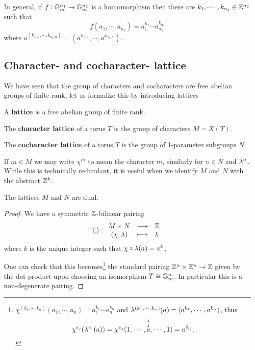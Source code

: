 \begin{remark}
In general, if $f:\mathbb{G}_m^{n_1}\to \mathbb{G}_m^{n_2}$ is a homomorphism then there are $k_1,\cdots, k_{n_1}\in \mathbb{Z}^{n_2}$ such that
\[f(a_1,\cdots, a_{n_1})=a_1^{k_1}\cdots a_{n_1}^{k_{n_1}}\]
where $a^{(k_{1,h},\cdots, k_{n_2,h})}=(a^{k_{1,h}},\cdots, a^{k_{n_2,h}})$.
\end{remark}

\subsection{Character- and cocharacter- lattice}
We have seen that the group of characters and cocharacters are free abelian groups of finite rank, let us formalize this by introducing lattices

\begin{definition}[Lattice]
A \textbf{lattice} is a free abelian group of finite rank.
\end{definition}

\begin{definition}
The \textbf{character lattice} of a torus $T$ is the group of characters $M=X(T)$.
\end{definition}

\begin{definition}
The \textbf{cocharacter lattice} of a torus $T$ is the group of 1-parameter subgroups $N$.
\end{definition}

\begin{notation}
If $m\in M$ we may write $\chi^m$ to mean the character $m$, similarly for $n\in N$ and $\lambda^n$. While this is technically redundant, it is useful when we identify $M$ and $N$ with the abstract $\mathbb{Z}^k$.
\end{notation}

\begin{proposition}[]\label{PrDualityOfCharacterLattices}
The lattices $M$ and $N$ are dual.
\end{proposition}
\begin{proof}
We have a symmetric $\mathbb{Z}$-bilinear pairing
\[\left\langle {,}\right\rangle:\begin{array}{ccc} {M\times N} & \longrightarrow & {\mathbb{Z}}\\ {(\chi,\lambda)} & \longmapsto & {k} \end{array}\]
where $k$ is the unique integer such that $\chi\circ\lambda(a)=a^k$.

One can check that this becomes\footnote{$\chi^{(k_1,\cdots, k_n)}(a_1,\cdots, a_n)=a_1^{k_1}\cdots a_n^{k_n}$ and $\lambda^{(k_1,\cdots, k_n)}(a)=(a^{k_1},\cdots, a^{k_n})$, thus 
\[\chi^{e_j}(\lambda^{e_i}(a))=\chi^{e_j}(1,\cdots, \overset{{\underset\downarrow i}}a, \cdots, 1)=a^{\delta_{ij}}.\]} the standard pairing $\mathbb{Z}^n\times \mathbb{Z}^n\to \mathbb{Z}$ given by the dot product upon choosing an isomorphism $T\cong \mathbb{G}_m^n$. In particular this is a non-degenerate pairing.
\end{proof}

